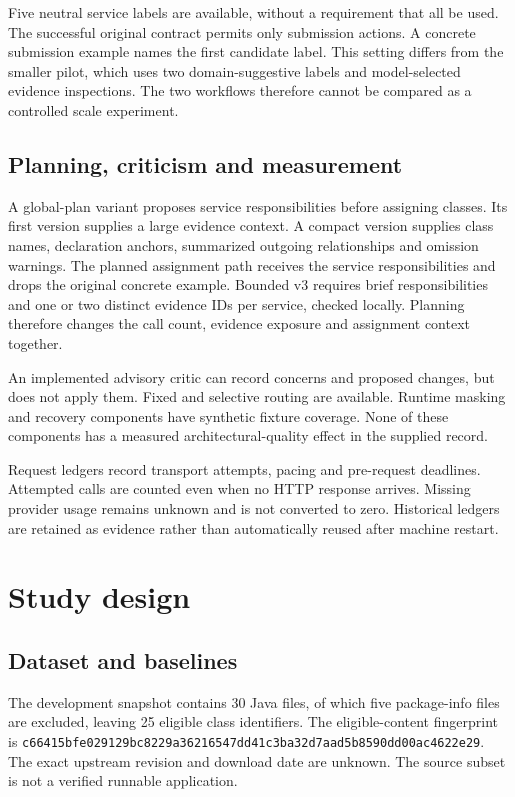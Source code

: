 Five neutral service labels are available, without a requirement that all be used. The successful original contract permits only submission actions. A concrete submission example names the first candidate label. This setting differs from the smaller pilot, which uses two domain-suggestive labels and model-selected evidence inspections. The two workflows therefore cannot be compared as a controlled scale experiment.

\subsection{Planning, criticism and measurement}

A global-plan variant proposes service responsibilities before assigning classes. Its first version supplies a large evidence context. A compact version supplies class names, declaration anchors, summarized outgoing relationships and omission warnings. The planned assignment path receives the service responsibilities and drops the original concrete example. Bounded v3 requires brief responsibilities and one or two distinct evidence IDs per service, checked locally. Planning therefore changes the call count, evidence exposure and assignment context together.

An implemented advisory critic can record concerns and proposed changes, but does not apply them. Fixed and selective routing are available. Runtime masking and recovery components have synthetic fixture coverage. None of these components has a measured architectural-quality effect in the supplied record.

Request ledgers record transport attempts, pacing and pre-request deadlines. Attempted calls are counted even when no HTTP response arrives. Missing provider usage remains unknown and is not converted to zero. Historical ledgers are retained as evidence rather than automatically reused after machine restart.

\section{Study design}

\subsection{Dataset and baselines}

The development snapshot contains 30 Java files, of which five package-info files are excluded, leaving 25 eligible class identifiers. The eligible-content fingerprint is \texttt{c66415bfe029129b\allowbreak{}c8229a36216547dd\allowbreak{}41c3ba32d7aad5b8\allowbreak{}590dd00ac4622e29}. The exact upstream revision and download date are unknown. The source subset is not a verified runnable application.

